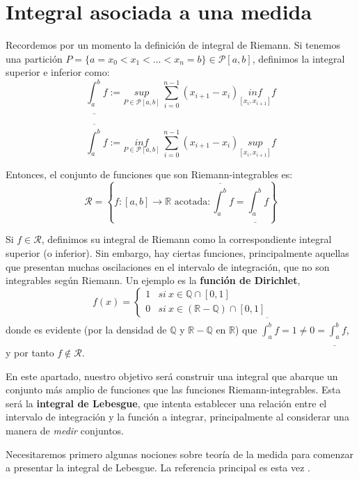 \documentclass[11pt, a4paper]{article}
\theoremstyle{theorem-style}
\theoremstyle{definition-style}
\theoremstyle{remark-style}
\theoremstyle{example-style}
\begin{document}
\section{Integral asociada a una medida}

Recordemos por un momento la definición de integral de Riemann. Si tenemos una partición $P = \{ a = x_0 < x_1 < \dots < x_n = b\} \in \mathcal P [a,b]$, definimos la integral superior e inferior como: $$\underline{\int_a^b} f := \underset{P \in \mathcal P [a,b]}{sup} \ \sum_{i=0}^{n-1} (x_{i+1} - x_i) \underset{[x_i, x_{i+1}]}{inf} f$$

$$\overline {\int_a^b} f := \underset{P \in \mathcal P [a,b]}{inf} \ \sum_{i=0}^{n-1} (x_{i+1} - x_i) \underset{[x_i, x_{i+1}]}{sup} f$$

Entonces, el conjunto de funciones que son Riemann-integrables es: $$\mathcal R = \left\{ f:[a,b] \to \mathbb{R} \text{ acotada} : \overline {\int_a^b} f = \underline {\int_a^b} f\right\}$$

Si $f \in \mathcal R$, definimos su integral de Riemann como la correspondiente integral superior (o inferior). Sin embargo, hay ciertas funciones, principalmente aquellas que presentan muchas oscilaciones en el intervalo de integración, que no son integrables según Riemann. Un ejemplo es la \textbf{función de Dirichlet}, $$f(x) = \begin{cases} 1 & si \ x \in \mathbb Q \cap [0,1]\\ 0 & si \ x \in (\mathbb{R} - \mathbb Q) \cap [0,1] \end{cases}$$ donde es evidente (por la densidad de $\mathbb Q$ y $\mathbb{R} - \mathbb Q$ en $\mathbb{R}$) que $\displaystyle \overline {\int_a^b} f = 1 \ne 0 = \underline {\int_a^b} f$, y por tanto $f \notin \mathcal R$.

En este apartado, nuestro objetivo será construir una integral que abarque un conjunto más amplio de funciones que las funciones Riemann-integrables. Esta será la \textbf{integral de Lebesgue}, que intenta establecer una relación entre el intervalo de integración y la función a integrar, principalmente al considerar una manera de \textit{medir} conjuntos.

Necesitaremos primero algunas nociones sobre teoría de la medida para comenzar a presentar la integral de Lebesgue. La referencia principal es esta vez \cite[Chapter 1]{rudin}.


\end{document}
